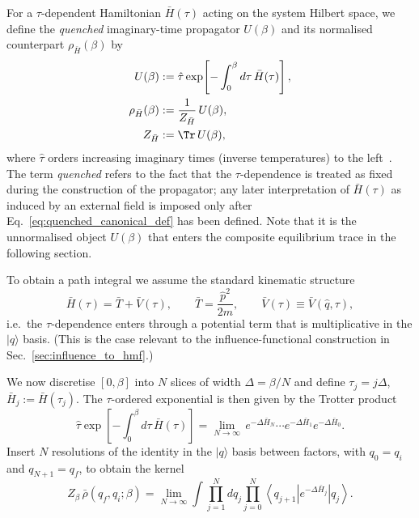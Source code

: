 For a $\tau$-dependent Hamiltonian $\bar H(\tau)$ acting on the system Hilbert
space, we define the \emph{quenched} imaginary-time propagator $U(\beta)$ and its
normalised counterpart $\rho_{\bar H}(\beta)$ by
\begin{equation}
\begin{split}
    U(\beta)
    &:=
    \hat\tau \exp\!\left[-\int_{0}^{\beta} d\tau\,\bar H(\tau)\right],
    \\
    \rho_{\bar H}(\beta)
    &:=
    \frac{1}{Z_{\bar H}}\, U(\beta),
    \\
    Z_{\bar H}&:=\Tr\, U(\beta),
\end{split}
    \label{eq:quenched_canonical_def}
\end{equation}
where $\hat\tau$ orders increasing imaginary times (inverse temperatures) to the left~\cite{feynmanQuantumMechanicsPath1965, kleinertPathIntegralsQuantum2009}.
The term \emph{quenched} refers to the fact that the $\tau$-dependence is treated as fixed
during the construction of the propagator; any later interpretation of $\bar H(\tau)$ as
induced by an external field is imposed only after Eq.~\eqref{eq:quenched_canonical_def}
has been defined. Note that it is the unnormalised object $U(\beta)$ that enters the
composite equilibrium trace in the following section.


To obtain a path integral we assume the standard kinematic structure
\begin{equation}
    \bar H(\tau)=\bar T+\bar V(\tau),
    \qquad
    \bar T=\frac{\hat p^2}{2m},
    \qquad
    \bar V(\tau)\equiv \bar V(\hat q,\tau),
    \label{eq:quenched_T_plus_V}
\end{equation}
i.e.\ the $\tau$-dependence enters through a potential term that is multiplicative in the
$|q\rangle$ basis. (This is the case relevant to the influence-functional construction
in Sec.~\ref{sec:influence_to_hmf}.)

We now discretise $[0,\beta]$ into $N$ slices of width $\Delta=\beta/N$ and define
$\tau_j=j\Delta$, $\bar H_j:=\bar H(\tau_j)$. The $\tau$-ordered exponential is then
given by the Trotter product~\cite{kleinertPathIntegralsQuantum2009,schulmanTechniquesApplicationsPath1981}
\begin{equation}
    \hat\tau \exp\!\left[-\int_{0}^{\beta} d\tau\,\bar H(\tau)\right]
    =\lim_{N\to\infty}\, e^{-\Delta \bar H_{N}}\cdots e^{-\Delta \bar H_{1}}e^{-\Delta \bar H_{0}}.
    \label{eq:quenched_timeslice}
\end{equation}
Insert $N$ resolutions of the identity in the $|q\rangle$ basis between factors, with
$q_0=q_i$ and $q_{N+1}=q_f$, to obtain the kernel
\begin{equation}
    Z_\beta\,\bar\rho(q_f,q_i;\beta)
    =
    \lim_{N\to\infty}
    \int \prod_{j=1}^{N} dq_j
    \prod_{j=0}^{N}
    \left\langle q_{j+1}\right| e^{-\Delta \bar H_j}\left|q_j\right\rangle.
    \label{eq:quenched_kernel_product}
\end{equation}

